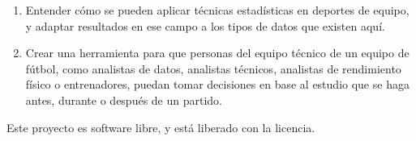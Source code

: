 \begin{enumerate}
    \item Entender cómo se pueden aplicar técnicas estadísticas en deportes de equipo, 
    y adaptar resultados en ese campo a los tipos de datos que existen aquí.
    \item Crear una herramienta para que personas del equipo 
    técnico de un equipo de fútbol, como analistas de datos, analistas técnicos, analistas de rendimiento 
    físico o entrenadores, puedan tomar decisiones en base al estudio que se haga antes, durante 
    o después de un partido. 
\end{enumerate}

Este proyecto es software libre, y está liberado con la licencia\cite{gplv3}.
